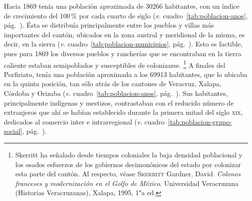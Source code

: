 \documentclass[14pt,twoside,final]{extbook} %
\let\oldfootnote\footnote
\renewcommand\footnote[1]{%
\oldfootnote{\hspace{1mm}#1}}
\begin{document}
Hacia 1869 tenía una población aproximada de 30266 habitantes, con un índice de crecimiento del 100\,\% por cada cuarto de siglo (\emph{v.} cuadro~\ref{tab:poblacion-anos}, pág.~\pageref{tab:poblacion-anos}). Ésta se distribuía principalmente entre los pueblos y villas más importantes del cantón, ubicados en la zona austral y meridional de la misma, es decir, en la sierra (\emph{v.} cuadro~\ref{tab:poblacion-municipios}, pág.~\pageref{tab:poblacion-municipios}). Esto es factible, pues para 1869 los diversos pueblos y rancherías que se encontraban en la tierra caliente estaban semipoblados y susceptibles de colonizarse.\footnote{Skerritt ha señalado desde tiempos coloniales la baja densidad poblacional y los osados esfuerzos de los gobiernos decimonónicos del estado por colonizar esta parte del cantón. Al respecto, véase \textsc{Skerritt} Gardner, David. \emph{Colonos franceses y modernización en el Golfo de México}. Universidad Veracruzana (Historias Veracruzanas), Xalapa, 1995, 1"a ed.} A finales del Porfiriato, tenía una población aproximada a los 69913 habitantes, que lo ubicaba en la quinta posición, tan sólo atrás de los cantones de Veracruz, Xalapa, Córdoba y Orizaba (\emph{v.} cuadro~\ref{tab:poblacion-anos}, pág.~\pageref{tab:poblacion-anos}). Sus habitantes, principalmente indígenas y mestizos, contrastaban con el reducido número de extranjeros que ahí se habían establecido durante la primera mitad del siglo \textsc{xix}, dedicados al comercio inter e intrarregional (\emph{v.} cuadro~\ref{tab:poblacion-grupo-social}, pág.~\pageref{tab:poblacion-grupo-social}).
\end{document}
